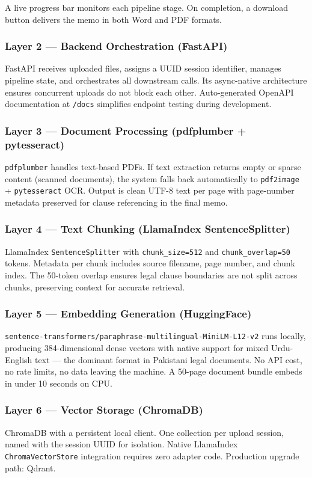 \documentclass[12pt, a4paper]{article}
\begin{document}
A live progress bar monitors each pipeline stage. On completion, a download
button delivers the memo in both Word and PDF formats.

\subsubsection{Layer 2 --- Backend Orchestration (FastAPI)}
FastAPI receives uploaded files, assigns a UUID session identifier, manages
pipeline state, and orchestrates all downstream calls. Its async-native
architecture ensures concurrent uploads do not block each other. Auto-generated
OpenAPI documentation at \texttt{/docs} simplifies endpoint testing during
development.

\subsubsection{Layer 3 --- Document Processing (pdfplumber + pytesseract)}
\texttt{pdfplumber} handles text-based PDFs. If text extraction returns empty or
sparse content (scanned documents), the system falls back automatically to
\texttt{pdf2image} + \texttt{pytesseract} OCR. Output is clean UTF-8 text per
page with page-number metadata preserved for clause referencing in the final memo.

\subsubsection{Layer 4 --- Text Chunking (LlamaIndex SentenceSplitter)}
LlamaIndex \texttt{SentenceSplitter} with \texttt{chunk\_size=512} and
\texttt{chunk\_overlap=50} tokens. Metadata per chunk includes source filename,
page number, and chunk index. The 50-token overlap ensures legal clause boundaries
are not split across chunks, preserving context for accurate retrieval.

\subsubsection{Layer 5 --- Embedding Generation (HuggingFace)}
\texttt{sentence-transformers/paraphrase-multilingual-MiniLM-L12-v2} runs
locally, producing 384-dimensional dense vectors with native support for
mixed Urdu-English text --- the dominant format in Pakistani legal documents.
No API cost, no rate limits, no data leaving the machine. A 50-page document
bundle embeds in under 10 seconds on CPU.

\subsubsection{Layer 6 --- Vector Storage (ChromaDB)}
ChromaDB with a persistent local client. One collection per upload session, named
with the session UUID for isolation. Native LlamaIndex \texttt{ChromaVectorStore}
integration requires zero adapter code. Production upgrade path: Qdrant.
\end{document}
